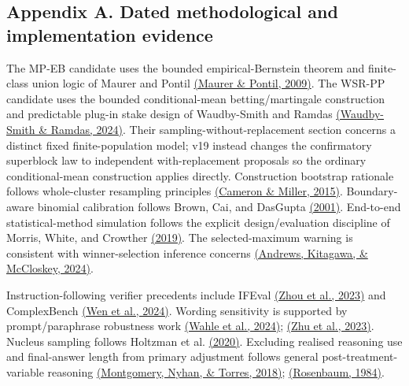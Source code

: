 \documentclass[11pt,a4paper]{article}
\begin{document}
\subsection*{Appendix A. Dated methodological and implementation evidence}
The MP-EB candidate uses the bounded empirical-Bernstein theorem and finite-class union logic of Maurer and Pontil \href{https://arxiv.org/abs/0907.3740}{(Maurer \& Pontil, 2009)}. The WSR-PP candidate uses the bounded conditional-mean betting/martingale construction and predictable plug-in stake design of Waudby-Smith and Ramdas \href{https://doi.org/10.1093/jrsssb/qkad009}{(Waudby-Smith \& Ramdas, 2024)}. Their sampling-without-replacement section concerns a distinct fixed finite-population model; v19 instead changes the confirmatory superblock law to independent with-replacement proposals so the ordinary conditional-mean construction applies directly. Construction bootstrap rationale follows whole-cluster resampling principles \href{https://cameron.econ.ucdavis.edu/research/Cameron_Miller_JHR_2015.pdf}{(Cameron \& Miller, 2015)}. Boundary-aware binomial calibration follows Brown, Cai, and DasGupta \href{https://www.stat.purdue.edu/~dasgupta/publications/tr99-19.pdf}{(2001)}. End-to-end statistical-method simulation follows the explicit design/evaluation discipline of Morris, White, and Crowther \href{https://doi.org/10.1002/sim.8086}{(2019)}. The selected-maximum warning is consistent with winner-selection inference concerns \href{https://doi.org/10.1093/qje/qjad043}{(Andrews, Kitagawa, \& McCloskey, 2024)}.

Instruction-following verifier precedents include IFEval \href{https://arxiv.org/abs/2311.07911}{(Zhou et al., 2023)} and ComplexBench \href{https://arxiv.org/abs/2407.03978}{(Wen et al., 2024)}. Wording sensitivity is supported by prompt/paraphrase robustness work \href{https://arxiv.org/abs/2406.19898}{(Wahle et al., 2024)}; \href{https://arxiv.org/abs/2306.04528}{(Zhu et al., 2023)}. Nucleus sampling follows Holtzman et al. \href{https://arxiv.org/abs/1904.09751}{(2020)}. Excluding realised reasoning use and final-answer length from primary adjustment follows general post-treatment-variable reasoning \href{https://doi.org/10.1111/ajps.12357}{(Montgomery, Nyhan, \& Torres, 2018)}; \href{https://doi.org/10.2307/2981697}{(Rosenbaum, 1984)}.
\end{document}
